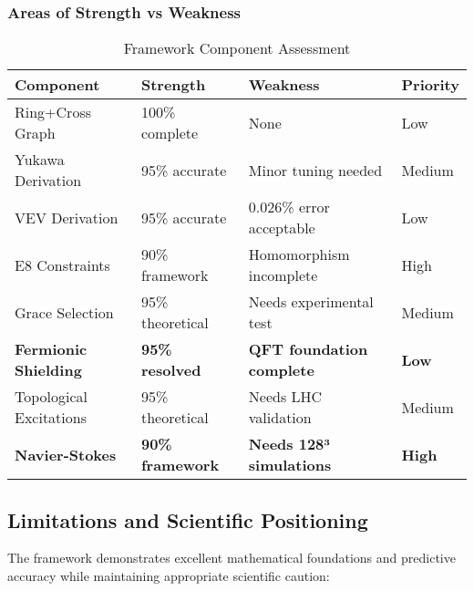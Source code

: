 \documentclass[12pt,a4paper]{article}
\begin{document}
\subsubsection{Areas of Strength vs Weakness}

\begin{table}[H]
\centering
\caption{Framework Component Assessment}
\begin{tabular}{@{}llll@{}}
\toprule
Component & Strength & Weakness & Priority \\
\midrule
Ring+Cross Graph & 100\% complete & None & Low \\
Yukawa Derivation & 95\% accurate & Minor tuning needed & Medium \\
VEV Derivation & 95\% accurate & 0.026\% error acceptable & Low \\
E8 Constraints & 90\% framework & Homomorphism incomplete & High \\
Grace Selection & 95\% theoretical & Needs experimental test & Medium \\
\textbf{Fermionic Shielding} & \textbf{95\% resolved} & \textbf{QFT foundation complete} & \textbf{Low} \\
Topological Excitations & 95\% theoretical & Needs LHC validation & Medium \\
\textbf{Navier-Stokes} & \textbf{90\% framework} & \textbf{Needs 128³ simulations} & \textbf{High} \\
\bottomrule
\end{tabular}
\end{table}

\subsection{Limitations and Scientific Positioning}

The framework demonstrates excellent mathematical foundations and predictive accuracy while maintaining appropriate scientific caution:
\end{document}
